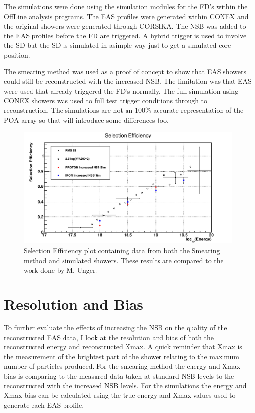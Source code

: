 The simulations were done using the simulation modules for the FD's within the OffLine analysis programs. The EAS profiles were generated within CONEX and the original showers were generated through CORSIKA. The NSB was added to the EAS profiles before the FD are triggered. A hybrid trigger is used to involve the SD but the SD is simulated in asimple way just to get a simulated core position.

The smearing method was used as a proof of concept to show that EAS showers could still be reconstructed with the increased NSB. The limitation was that EAS were used that already triggered the FD's normally. The full simulation using CONEX showers was used to full test trigger conditions through to reconstruction. The simulations are not an 100\% accurate representation of the POA array so that will introduce some differences too.


\begin{figure}[!hp]
\centering
\includegraphics[width=\textwidth]{chapters/graphs/SelectionEff/SelectionEff_errorbars_10timesNSB.pdf}
\caption{Selection Efficiency plot containing data from both the Smearing method and simulated showers. These results are compared to the work done by M. Unger.}
\end{figure}

\section{Resolution and Bias}

To further evaluate the effects of increasing the NSB on the quality of the reconstructed EAS data, I look at the resolution and bias of both the reconstructed energy and reconstructed Xmax. A quick reminder that Xmax is the measurement of the brightest part of the shower relating to the maximum number of particles produced. For the smearing method the energy and Xmax bias is comparing to the measured data taken at standard NSB levels to the reconstructed with the increased NSB levels. For the simulations the energy and Xmax bias can be calculated using the true energy and Xmax values used to generate each EAS profile.

